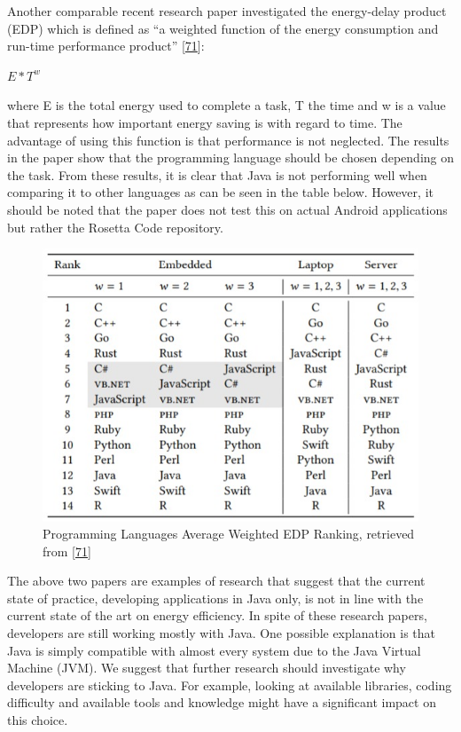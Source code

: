 \documentclass[]{book}
\begin{document}
Another comparable recent research paper investigated the energy-delay
product (EDP) which is defined as ``a weighted function of the energy
consumption and run-time performance product''
{[}\protect\hyperlink{ref-GKLS2018}{71}{]}:

\(E * T^w\)

where E is the total energy used to complete a task, T the time and w is
a value that represents how important energy saving is with regard to
time. The advantage of using this function is that performance is not
neglected. The results in the paper show that the programming language
should be chosen depending on the task. From these results, it is clear
that Java is not performing well when comparing it to other languages as
can be seen in the table below. However, it should be noted that the
paper does not test this on actual Android applications but rather the
Rosetta Code repository.

\begin{figure}
\centering
\includegraphics{figures/EDPranking.jpeg}
\caption{Programming Languages Average Weighted EDP Ranking, retrieved
from {[}\protect\hyperlink{ref-GKLS2018}{71}{]}}
\end{figure}

The above two papers are examples of research that suggest that the
current state of practice, developing applications in Java only, is not
in line with the current state of the art on energy efficiency. In spite
of these research papers, developers are still working mostly with Java.
One possible explanation is that Java is simply compatible with almost
every system due to the Java Virtual Machine (JVM). We suggest that
further research should investigate why developers are sticking to Java.
For example, looking at available libraries, coding difficulty and
available tools and knowledge might have a significant impact on this
choice.
\end{document}
